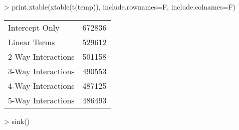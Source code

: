 
> print.xtable(xtable(t(temp)), include.rownames=F, include.colnames=F)
\begin{table}[ht]
\centering
\begin{tabular}{ll}
  \hline
  \hline
Intercept Only & 672836 \\ 
  Linear Terms & 529612 \\ 
  2-Way Interactions & 501158 \\ 
  3-Way Interactions & 490553 \\ 
  4-Way Interactions & 487125 \\ 
  5-Way Interactions & 486493 \\ 
   \hline
\end{tabular}
\end{table}

> sink()
